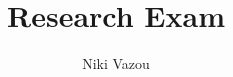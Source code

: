 \documentclass[runningheads,a4paper]{article}
\title{Research Exam}
\author{
  Niki Vazou
}
\begin{document}




%
%
%
%
%
%

{


}
\end{document}
